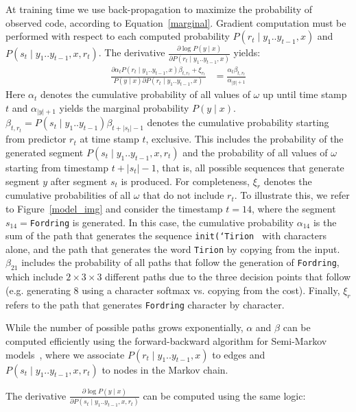 \documentclass[11pt]{article}
\begin{document}
At training time we use back-propagation to maximize the probability of observed code, according to Equation~\ref{marginal}. Gradient computation must be performed with respect to each computed probability $P(r_t \mid y_1..y_{t-1}, x)$ and $P(s_t \mid y_1..y_{t-1}, x, r_t)$. The derivative $\frac{\partial \log P(y \mid x)}{\partial P(r_t \mid y_1..y_{t-1}, x)}$ yields:
\begin{align*}
\label{derivative}
\frac{\partial \alpha_{t}P(r_t \mid y_1..y_{t-1}, x)\beta_{t,r_t} + \xi_{r_t}}{P(y \mid x) \partial P(r_t \mid y_1..y_{t-1}, x)} &= \frac{\alpha_{t}\beta_{t,r_t}}{\alpha_{|y|+1}}
\end{align*}
Here $\alpha_{t}$ denotes the cumulative probability of all values of $\omega$
up until time stamp $t$ and $\alpha_{|y|+1}$ yields the marginal
probability $P(y \mid x)$. $\beta_{t, r_t} = P(s_t \mid y_1..y_{t-1})\beta_{t+|s_t|-1}$ denotes the cumulative probability
starting from predictor $r_t$ at time stamp $t$, exclusive. This includes the probability of the generated segment $P(s_t \mid y_1..y_{t-1}, x, r_t)$ and the probability of all values of $\omega$ starting from timestamp $t+|s_t|-1$, that is, all possible sequences that generate segment $y$ after segment $s_t$ is produced. For
completeness, $\xi_{r}$ denotes the cumulative probabilities of all $\omega$
that do not include $r_t$. To illustrate this, we refer to Figure~\ref{model_img} and consider the timestamp $t=14$, where the segment $s_{14}=$\texttt{Fordring} is generated. In this case, the cumulative probability $\alpha_{14}$ is the sum of the path that generates the sequence \texttt{init(`Tirion } with characters alone, and the path that generates the word \texttt{Tirion} by copying from the input. $\beta_{21}$ includes the probability of all paths that follow the generation of \texttt{Fordring}, which include $2\times3\times3$ different paths due to the three decision points that follow (e.g. generating 8 using a character softmax vs. copying from the cost). Finally, $\xi_{r}$ refers to the path that generates \texttt{Fordring} character by character.

While the number of possible paths grows exponentially, $\alpha$ and $\beta$ can be computed
efficiently using the forward-backward algorithm for Semi-Markov
models~\cite{NIPS2004_2648}, where we associate $P(r_t \mid y_1..y_{t-1},
x)$ to edges and $P(s_t \mid y_1..y_{t-1}, x, r_t)$ to nodes in the
Markov chain. 

The derivative $\frac{\partial \log P(y \mid x)}{\partial P(s_t \mid
y_1..y_{t-1}, x, r_t)}$ can be computed using the same logic:
\end{document}
